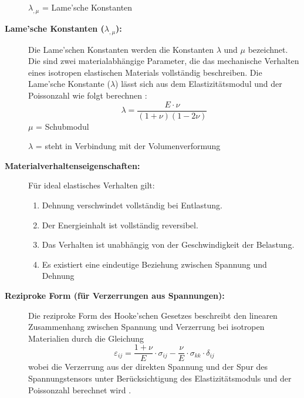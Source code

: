 \begin{description}
	 $\lambda_{,\mu}$ = Lame’sche Konstanten
	 
	 \item[\textbf{Lame’sche Konstanten ($\lambda_{,\mu}$):}] Die Lame'schen Konstanten werden die Konstanten $\lambda$ und $\mu$ bezeichnet. 
	 Die sind zwei materialabhängige Parameter, die das mechanische Verhalten eines isotropen elastischen Materials vollständig beschreiben.
	 Die Lame’sche Konstante ($\lambda$) lässt sich aus dem Elastizitätsmodul und der Poissonzahl wie folgt berechnen \cite{elastomechanik:Grundlagen der Elastizitaetstheorie}:
	 \begin{equation}
	 	\lambda = 
	 	\frac{E \cdot \nu}{(1 + \nu)(1 - 2\nu)}
	 \end{equation}
	 $\mu$ = Schubmodul
	 
	 $\lambda$ = steht in Verbindung mit der Volumenverformung
	 
	 \item[\textbf{Materialverhaltenseigenschaften:}] Für ideal elastisches Verhalten gilt:
	 \begin{enumerate}
	 	\item Dehnung verschwindet vollständig bei Entlastung.
	 	
	 	\item Der Energieinhalt ist vollständig reversibel.
	 	
	 	\item Das Verhalten ist unabhängig von der Geschwindigkeit der Belastung.
	 	
	 	\item Es existiert eine eindeutige Beziehung zwischen Spannung und Dehnung
	 \end{enumerate}
	 \item[\textbf{Reziproke Form (für Verzerrungen aus Spannungen):}] Die reziproke Form des Hooke’schen Gesetzes beschreibt den linearen Zusammenhang zwischen Spannung und Verzerrung bei isotropen Materialien durch die Gleichung
	 \begin{equation}
	 	\varepsilon_{ij} = 
	 	\frac{1+\nu}{E} \cdot \sigma_{ij} - \frac{\nu}{E} \cdot \sigma_{kk} \cdot \delta_{ij}
	 \end{equation}
	 wobei die Verzerrung aus der direkten Spannung und der Spur des Spannungstensors unter Berücksichtigung des Elastizitätsmoduls und der Poissonzahl berechnet wird \cite{elastomechanik:Grundlagen der Elastizitaetstheorie}.
\end{description}